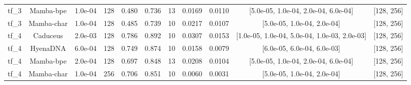 \begin{landscape}
\begin{table}[]
\begin{tabular}{@{}lcccccccccc@{}}
tf\_3 & Mamba-bpe & 1.0e-04 & 128 & 0.480 & 0.736 & 13 & 0.0169 & 0.0110 & [5.0e-05, 1.0e-04, 2.0e-04, 6.0e-04] & [128, 256] \\
tf\_3 & Mamba-char & 1.0e-04 & 128 & 0.485 & 0.739 & 10 & 0.0217 & 0.0107 & [5.0e-05, 1.0e-04, 2.0e-04] & [128, 256] \\
tf\_4 & Caduceus & 2.0e-03 & 128 & 0.786 & 0.892 & 10 & 0.0307 & 0.0153 & [1.0e-05, 1.0e-04, 5.0e-04, 1.0e-03, 2.0e-03] & [128, 256] \\
tf\_4 & HyenaDNA & 6.0e-04 & 128 & 0.749 & 0.874 & 10 & 0.0158 & 0.0079 & [6.0e-05, 6.0e-04, 6.0e-03] & [128, 256] \\
tf\_4 & Mamba-bpe & 2.0e-04 & 128 & 0.697 & 0.848 & 13 & 0.0208 & 0.0104 & [5.0e-05, 1.0e-04, 2.0e-04, 6.0e-04] & [128, 256] \\
tf\_4 & Mamba-char & 1.0e-04 & 256 & 0.706 & 0.851 & 10 & 0.0060 & 0.0031 & [5.0e-05, 1.0e-04, 2.0e-04] & [128, 256] \\
\bottomrule
\end{tabular}
\end{table}
\end{landscape}